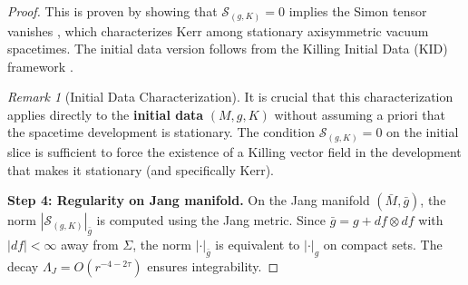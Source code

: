 \documentclass[12pt]{article}
\theoremstyle{plain}
\theoremstyle{definition}
\theoremstyle{remark}
\newtheorem{remark}[theorem]{Remark}
\newcommand{\bg}{\bar{g}}
\newcommand{\bM}{\bar{M}}
\begin{document}
\begin{proof}[Proof]
This is proven by showing that $\mathcal{S}_{(g,K)} = 0$ implies the Simon tensor vanishes \cite{simon1984}, which characterizes Kerr among stationary axisymmetric vacuum spacetimes. The initial data version follows from the Killing Initial Data (KID) framework \cite{beigchrusciel1996}.
\begin{remark}[Initial Data Characterization]
It is crucial that this characterization applies directly to the \textbf{initial data} $(M, g, K)$ without assuming a priori that the spacetime development is stationary. The condition $\mathcal{S}_{(g,K)}=0$ on the initial slice is sufficient to force the existence of a Killing vector field in the development that makes it stationary (and specifically Kerr).
\end{remark}

\textbf{Step 4: Regularity on Jang manifold.}
On the Jang manifold $(\bM, \bg)$, the norm $|\mathcal{S}_{(g,K)}|_{\bg}$ is computed using the Jang metric. Since $\bg = g + df \otimes df$ with $|df| < \infty$ away from $\Sigma$, the norm $|\cdot|_{\bg}$ is equivalent to $|\cdot|_g$ on compact sets. The decay $\Lambda_J = O(r^{-4-2\tau})$ ensures integrability.
\end{proof}
\end{document}
